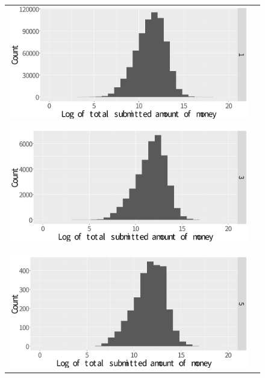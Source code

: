 \documentclass[dvipdfmx, english]{ampmt}             %
\begin{document}
\begin{figure}[ht]
	\begin{tabular}{cc}
	\begin{minipage}{.5\hsize}
	\centering
	\centerline{\includegraphics[scale=0.22]{../img/spc-type-variance/1.pdf}}
	\subcaption{}\label{fig:1}
	\end{minipage} 
      \begin{minipage}{.5\hsize}
        \centering
        \centerline{\includegraphics[scale=0.22]{../img/spc-type-variance/3.pdf}}
	\subcaption{}\label{fig:3}
      \end{minipage} \\
       \begin{minipage}{.5\hsize}
        \centering
        \centerline{\includegraphics[scale=0.22]{../img/spc-type-variance/5.pdf}}

\end{minipage}
\end{tabular}
\end{figure}
\end{document}
